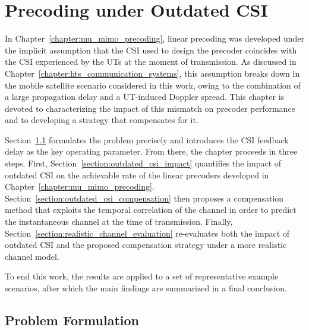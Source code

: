 \chapter{Precoding under Outdated CSI}
\label{chapter:precoding_under_outdated_csi}

In Chapter~\ref{chapter:mu_mimo_precoding}, linear precoding was developed under the implicit assumption that the \ac{CSI} used to design the precoder coincides with the \ac{CSI} experienced by the \acp{UT} at the moment of transmission.
As discussed in Chapter~\ref{chapter:hts_communication_systems}, this assumption breaks down in the mobile satellite scenario considered in this work, owing to the combination of a large propagation delay and a \ac{UT}-induced Doppler spread.
This chapter is devoted to characterizing the impact of this mismatch on precoder performance and to developing a strategy that compensates for it.

Section~\ref{section:outdated_csi_problem_formulation} formulates the problem precisely and introduces the \ac{CSI} feedback delay as the key operating parameter. From there, the chapter proceeds in three steps.
First, Section~\ref{section:outdated_csi_impact} quantifies the impact of outdated \ac{CSI} on the achievable rate of the linear precoders developed in Chapter~\ref{chapter:mu_mimo_precoding}.
Section~\ref{section:outdated_csi_compensation} then proposes a compensation method that exploits the temporal correlation of the channel in order to predict the instantaneous channel at the time of transmission.
Finally, Section~\ref{section:realistic_channel_evaluation} re-evaluates both the impact of outdated \ac{CSI} and the proposed compensation strategy under a more realistic channel model.

To end this work, the results are applied to a set of representative example scenarios, after which the main findings are summarized in a final conclusion.

\section{Problem Formulation}
\label{section:outdated_csi_problem_formulation}


